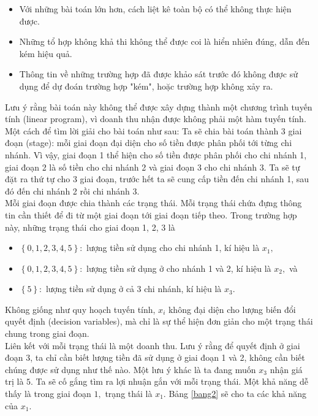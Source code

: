 \documentclass[12pt,a4paper]{article}
\begin{document}
\begin{itemize}
\item Với những bài toán lớn hơn, cách liệt kê toàn bộ có thể không thực hiện được.
\item Những tổ hợp không khả thi không thể được coi là hiển nhiên đúng, dẫn đến kém hiệu quả.
\item Thông tin về những trường hợp đã được khảo sát trước đó không được sử dụng để dự đoán trường hợp "kém", hoặc trường hợp không xảy ra.
\end{itemize}
Lưu ý rằng bài toán này không thể được xây dựng thành một chương trình tuyến tính (linear program), vì doanh thu nhận được không phải một hàm tuyến tính.\\
Một cách để tìm lời giải cho bài toán như sau:
Ta sẽ chia bài toán thành 3 giai đoạn (stage): mỗi giai đoạn đại diện cho số tiền được phân phối tới từng chi nhánh. Vì vậy, giai đoạn 1 thể hiện cho số tiền được phân phối cho chi nhánh 1, giai đoạn 2 là số tiền cho chi nhánh 2 và giai đoạn 3 cho chi nhánh 3. Ta sẽ tự đặt ra thứ tự cho 3 giai đoạn, trước hết ta sẽ cung cấp tiền đến chi nhánh 1, sau đó đến chi nhánh 2 rồi chi nhánh 3.\\
Mỗi giai đoạn được chia thành các trạng thái. Mỗi trạng thái chứa đựng thông tin cần thiết để đi từ một giai đoạn tới giai đoạn tiếp theo. Trong trường hợp này, những trạng thái cho giai đoạn 1, 2, 3 là
\begin{itemize}
\item \(\left\{ {0,1,2,3,4,5} \right\}:\) lượng tiền sử dụng cho chi nhánh 1, kí hiệu là \(x_1,\)
\item \(\left\{ {0,1,2,3,4,5} \right\}:\) lượng tiền sử dụng ở cho nhánh 1 và 2, kí hiệu là \(x_2,\) và
\item \(\left\{ {5} \right\}:\) lượng tiền sử dụng ở cả 3 chi nhánh, kí hiệu là \(x_3.\)
\end{itemize}
Không giống như quy hoạch tuyến tính, \(x_i\) không đại diện cho lượng biến đổi quyết định (decision variables), mà chỉ là sự thể hiện đơn giản cho một trạng thái chung trong giai đoạn.\\
Liên kết với mỗi trạng thái là một doanh thu. Lưu ý rằng để quyết định ở giai đoạn 3, ta chỉ cần biết lượng tiền đã sử dụng ở giai đoạn 1 và 2, không cần biết chúng được sử dụng như thế nào. Một lưu ý khác là ta đang muốn \(x_3\) nhận giá trị là \(5.\)
Ta sẽ cố gắng tìm ra lợi nhuận gắn với mỗi trạng thái. Một khả năng dễ thấy là trong giai đoạn \(1,\) trạng thái là \(x_1.\) Bảng \ref{bang2} sẽ cho ta các khả năng của \(x_1.\)\\
\end{document}
